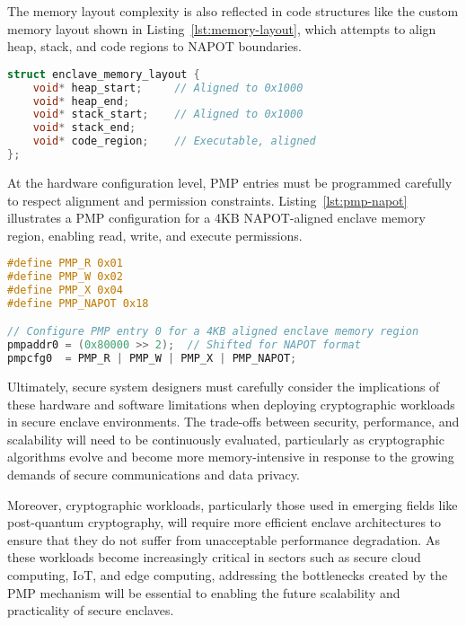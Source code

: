 The memory layout complexity is also reflected in code structures like the custom memory layout shown in Listing~\ref{lst:memory-layout}, which attempts to align heap, stack, and code regions to NAPOT boundaries.

\begin{lstlisting}[language=C, caption={Custom memory layout aligned to NAPOT for enclave use.}, label={lst:memory-layout}]
struct enclave_memory_layout {
    void* heap_start;     // Aligned to 0x1000
    void* heap_end;
    void* stack_start;    // Aligned to 0x1000
    void* stack_end;
    void* code_region;    // Executable, aligned
};
\end{lstlisting}

At the hardware configuration level, PMP entries must be programmed carefully to respect alignment and permission constraints. Listing~\ref{lst:pmp-napot} illustrates a PMP configuration for a 4KB NAPOT-aligned enclave memory region, enabling read, write, and execute permissions.

\begin{lstlisting}[language=C, caption={Example PMP configuration for a NAPOT-aligned memory region.}, label={lst:pmp-napot}]
#define PMP_R 0x01
#define PMP_W 0x02
#define PMP_X 0x04
#define PMP_NAPOT 0x18

// Configure PMP entry 0 for a 4KB aligned enclave memory region
pmpaddr0 = (0x80000 >> 2);  // Shifted for NAPOT format
pmpcfg0  = PMP_R | PMP_W | PMP_X | PMP_NAPOT;
\end{lstlisting}

Ultimately, secure system designers must carefully consider the implications of these hardware and software limitations when deploying cryptographic workloads in secure enclave environments. The trade-offs between security, performance, and scalability will need to be continuously evaluated, particularly as cryptographic algorithms evolve and become more memory-intensive in response to the growing demands of secure communications and data privacy.

Moreover, cryptographic workloads, particularly those used in emerging fields like post-quantum cryptography, will require more efficient enclave architectures to ensure that they do not suffer from unacceptable performance degradation. As these workloads become increasingly critical in sectors such as secure cloud computing, IoT, and edge computing, addressing the bottlenecks created by the PMP mechanism will be essential to enabling the future scalability and practicality of secure enclaves.

